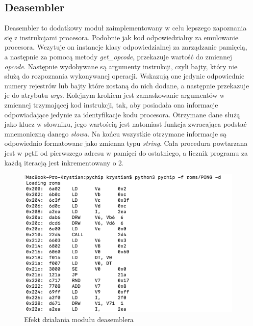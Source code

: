 \subsection{Deasembler}
Deasembler to dodatkowy moduł zaimplementowany w celu lepszego zapoznania się z instrukcjami procesora. Podobnie jak kod odpowiedzialny za emulowanie procesora. Wczytuje on instancje klasy odpowiedzialnej za zarządzanie pamięcią, a następnie za pomocą metody \textit{get\_opcode}, przekazuje wartość do zmiennej \textit{opcode}. Następnie wydobywane są argumenty instrukcji, czyli bajty, który nie służą do rozpoznania wykonywanej operacji. Wskazują one jedynie odpowiednie numery rejestrów lub bajty które zostaną do nich dodane, a następnie przekazuje je do atrybutu \textit{args}. Kolejnym krokiem jest zamaskowanie argumentów w zmiennej trzymającej kod instrukcji, tak, aby posiadała ona informacje odpowiadające jedynie za identyfikacje kodu procesora. Otrzymane dane służą jako klucz w słowniku, jego wartością jest natomiast funkcja zwracająca podstać mnemoniczną danego \textit{słowa}. Na końcu wszystkie otrzymane informacje są odpowiednio formatowane jako zmienna typu \textit{string}. Cała procedura powtarzana jest w pętli od pierwszego adresu w pamięci do ostatniego, a licznik programu za każdą iteracją jest inkrementowany o 2.
\begin{figure}[!htb]
	\begin{center}
		\includegraphics[scale=0.6]{images/outputDasm.png}
		\caption{Efekt działania modułu deasemblera}
	\end{center}
\end{figure}

